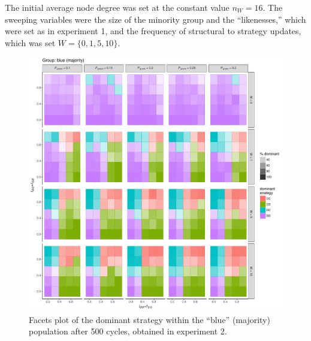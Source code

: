 The initial average node degree was set at the constant value $ n_W = 16 $. The sweeping variables were the size of the minority group and the ``likenesses,'' which were set as in experiment 1, and the frequency of structural to strategy updates, which was set $ W = \{0,1,5,10\} $.
\begin{figure}[ht!]
	\label{fig:strategyHostExperiment2}
	\begin{minipage}[c]{0.2\linewidth}
		\caption{Facets plot of the dominant strategy within the ``blue'' (majority) population after 500 cycles, obtained in experiment 2.}
	\end{minipage}
	\begin{minipage}[c]{0.75\linewidth}
		\includegraphics[trim={0cm 0cm 0.4cm 0cm}, clip, width=\linewidth]{figures/strategyHostExperiment2.pdf}
	\end{minipage}
\end{figure}

